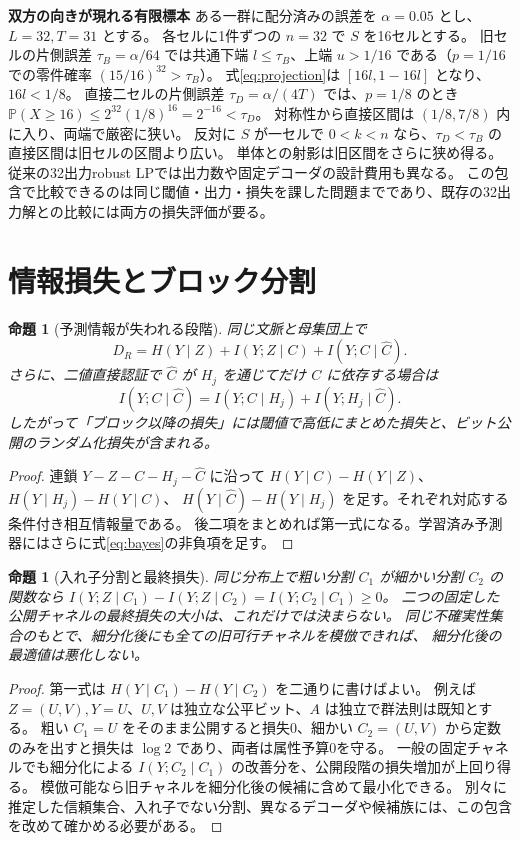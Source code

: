 \documentclass[a4paper,11pt]{ltjsarticle}
\theoremstyle{jp}
\newtheorem{prop}[thm]{命題}
\newcommand{\PP}{\mathbb P}
\newcommand{\Dc}{D_R}
\newcommand{\cx}{\widehat C}
\newcommand{\para}[1]{\par\Needspace{3\baselineskip}\addvspace{.6\baselineskip}\noindent\textbf{#1}\enspace}
\begin{document}
\para{双方の向きが現れる有限標本}
ある一群に配分済みの誤差を \(\alpha=0.05\) とし、\(L=32,T=31\) とする。
各セルに1件ずつの \(n=32\) で \(S\) を16セルとする。
旧セルの片側誤差 \(\tau_B=\alpha/64\) では共通下端 \(l\le\tau_B\)、上端 \(u>1/16\)
である（\(p=1/16\) での零件確率 \((15/16)^{32}>\tau_B\)）。
式\eqref{eq:projection}は \([16l,1-16l]\) となり、\(16l<1/8\)。
直接二セルの片側誤差 \(\tau_D=\alpha/(4T)\) では、\(p=1/8\) のとき
\(\PP(X\ge16)\le 2^{32}(1/8)^{16}=2^{-16}<\tau_D\)。
対称性から直接区間は \((1/8,7/8)\) 内に入り、両端で厳密に狭い。
反対に \(S\) が一セルで \(0<k<n\) なら、\(\tau_D<\tau_B\) の直接区間は旧セルの区間より広い。
単体との射影は旧区間をさらに狭め得る。
従来の32出力robust LPでは出力数や固定デコーダの設計費用も異なる。
この包含で比較できるのは同じ閾値・出力・損失を課した問題までであり、既存の32出力解との比較には両方の損失評価が要る。

\section{情報損失とブロック分割}

\begin{prop}[予測情報が失われる段階]\label{th:decomp}
同じ文脈と母集団上で
\[
 \Dc=H(Y\mid Z)+I(Y;Z\mid C)+I(Y;C\mid\cx).
\]
さらに、二値直接認証で \(\cx\) が \(H_j\) を通じてだけ \(C\) に依存する場合は
\[
 I(Y;C\mid\cx)=I(Y;C\mid H_j)+I(Y;H_j\mid\cx).
\]
したがって「ブロック以降の損失」には閾値で高低にまとめた損失と、ビット公開のランダム化損失が含まれる。
\end{prop}
\begin{proof}
連鎖 \(Y-Z-C-H_j-\cx\) に沿って
\(H(Y\mid C)-H(Y\mid Z)\)、\(H(Y\mid H_j)-H(Y\mid C)\)、
\(H(Y\mid\cx)-H(Y\mid H_j)\) を足す。それぞれ対応する条件付き相互情報量である。
後二項をまとめれば第一式になる。学習済み予測器にはさらに式\eqref{eq:bayes}の非負項を足す。
\end{proof}

\begin{prop}[入れ子分割と最終損失]\label{th:nested}
同じ分布上で粗い分割 \(C_1\) が細かい分割 \(C_2\) の関数なら
\(I(Y;Z\mid C_1)-I(Y;Z\mid C_2)=I(Y;C_2\mid C_1)\ge0\)。
二つの固定した公開チャネルの最終損失の大小は、これだけでは決まらない。
同じ不確実性集合のもとで、細分化後にも全ての旧可行チャネルを模倣できれば、
細分化後の\emph{最適値}は悪化しない。
\end{prop}
\begin{proof}
第一式は \(H(Y\mid C_1)-H(Y\mid C_2)\) を二通りに書けばよい。
例えば \(Z=(U,V),Y=U\)、\(U,V\) は独立な公平ビット、\(A\) は独立で群法則は既知とする。
粗い \(C_1=U\) をそのまま公開すると損失0、細かい \(C_2=(U,V)\) から定数のみを出すと損失は \(\log2\) であり、両者は属性予算0を守る。
一般の固定チャネルでも細分化による \(I(Y;C_2\mid C_1)\) の改善分を、公開段階の損失増加が上回り得る。
模倣可能なら旧チャネルを細分化後の候補に含めて最小化できる。
別々に推定した信頼集合、入れ子でない分割、異なるデコーダや候補族には、この包含を改めて確かめる必要がある。
\end{proof}
\end{document}
